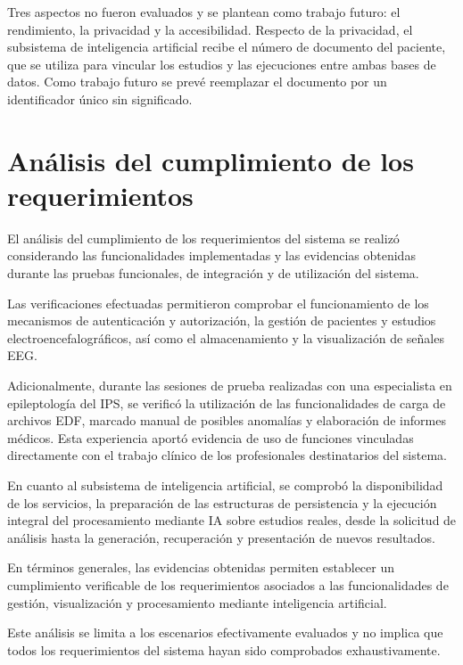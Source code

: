 Tres aspectos no fueron evaluados y se plantean como trabajo futuro: el rendimiento, la privacidad y la accesibilidad.
Respecto de la privacidad, el subsistema de inteligencia artificial recibe el número de documento del paciente, que se utiliza para vincular los estudios y las ejecuciones entre ambas bases de datos.
Como trabajo futuro se prevé reemplazar el documento por un identificador único sin significado.


\clearpage
\section[Análisis del cumplimiento de los requerimientos]{Análisis del cumplimiento de los \\requerimientos}

El análisis del cumplimiento de los requerimientos
del sistema se realizó considerando las
funcionalidades implementadas y las evidencias
obtenidas durante las pruebas funcionales,
de integración y de utilización del sistema.

Las verificaciones efectuadas permitieron
comprobar el funcionamiento de los mecanismos
de autenticación y autorización, la gestión
de pacientes y estudios electroencefalográficos,
así como el almacenamiento y la visualización
de señales EEG.

Adicionalmente, durante las sesiones de prueba
realizadas con una especialista en epileptología
del IPS, se verificó la utilización de las
funcionalidades de carga de archivos EDF,
marcado manual de posibles anomalías y
elaboración de informes médicos. Esta
experiencia aportó evidencia de uso de
funciones vinculadas directamente con el
trabajo clínico de los profesionales
destinatarios del sistema.


En cuanto al subsistema de inteligencia artificial, se comprobó la disponibilidad de los servicios, la preparación de las estructuras de persistencia y la ejecución integral del procesamiento mediante IA sobre estudios reales, desde la solicitud de análisis hasta la generación, recuperación y presentación de nuevos resultados.


En términos generales, las evidencias obtenidas permiten establecer un cumplimiento verificable de los requerimientos asociados a las funcionalidades de gestión, visualización y procesamiento mediante inteligencia artificial.

Este análisis se limita a los escenarios
efectivamente evaluados y no implica que
todos los requerimientos del sistema hayan
sido comprobados exhaustivamente.


